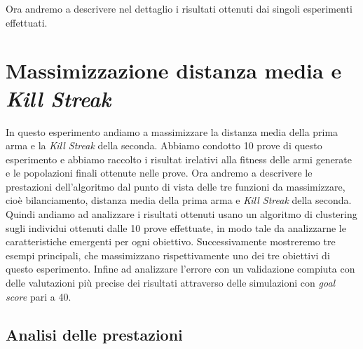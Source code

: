 \documentclass[12pt, italian]{toptesi}
\begin{document}
Ora andremo a descrivere nel dettaglio i risultati ottenuti dai singoli esperimenti effettuati.

\section{Massimizzazione distanza media e \emph{Kill Streak}}
\label{sec:dist_kill}

In questo esperimento andiamo a massimizzare la distanza media della prima arma e la \emph{Kill Streak} della seconda. 
Abbiamo condotto 10 prove di questo esperimento e abbiamo raccolto i risultat irelativi alla fitness delle armi generate e le popolazioni finali ottenute nelle prove.
Ora andremo a descrivere le prestazioni dell'algoritmo dal punto di vista delle tre funzioni da massimizzare, cioè bilanciamento, distanza media della prima arma e \emph{Kill Streak} della seconda.
Quindi andiamo ad analizzare i risultati ottenuti usano un algoritmo di clustering sugli individui ottenuti dalle 10 prove effettuate, in modo tale da analizzarne le caratteristiche emergenti per ogni obiettivo.
Successivamente mostreremo tre esempi principali, che massimizzano rispettivamente uno dei tre obiettivi di questo esperimento.
Infine ad analizzare l'errore con un validazione compiuta con delle valutazioni più precise dei risultati attraverso delle simulazioni con \emph{goal score} pari a 40.

\subsection{Analisi delle prestazioni}
\end{document}
